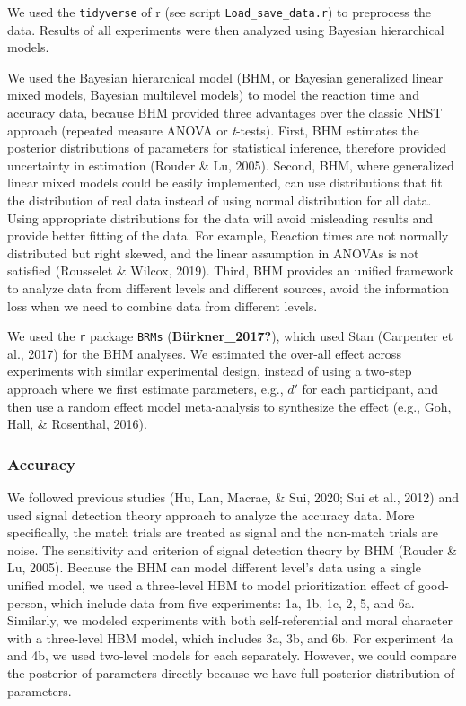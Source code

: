 \documentclass[
  man]{apa6}
\begin{document}
We used the \texttt{tidyverse} of r (see script \texttt{Load\_save\_data.r}) to preprocess the data. Results of all experiments were then analyzed using Bayesian hierarchical models.

We used the Bayesian hierarchical model (BHM, or Bayesian generalized linear mixed models, Bayesian multilevel models) to model the reaction time and accuracy data, because BHM provided three advantages over the classic NHST approach (repeated measure ANOVA or \emph{t}-tests). First, BHM estimates the posterior distributions of parameters for statistical inference, therefore provided uncertainty in estimation (Rouder \& Lu, 2005). Second, BHM, where generalized linear mixed models could be easily implemented, can use distributions that fit the distribution of real data instead of using normal distribution for all data. Using appropriate distributions for the data will avoid misleading results and provide better fitting of the data. For example, Reaction times are not normally distributed but right skewed, and the linear assumption in ANOVAs is not satisfied (Rousselet \& Wilcox, 2019). Third, BHM provides an unified framework to analyze data from different levels and different sources, avoid the information loss when we need to combine data from different levels.

We used the \texttt{r} package \texttt{BRMs} (\textbf{Bürkner\_2017?}), which used Stan (Carpenter et al., 2017) for the BHM analyses. We estimated the over-all effect across experiments with similar experimental design, instead of using a two-step approach where we first estimate parameters, e.g., \(d'\) for each participant, and then use a random effect model meta-analysis to synthesize the effect (e.g., Goh, Hall, \& Rosenthal, 2016).

\hypertarget{accuracy}{%
\subsubsection{Accuracy}\label{accuracy}}

We followed previous studies (Hu, Lan, Macrae, \& Sui, 2020; Sui et al., 2012) and used signal detection theory approach to analyze the accuracy data. More specifically, the match trials are treated as signal and the non-match trials are noise. The sensitivity and criterion of signal detection theory by BHM (Rouder \& Lu, 2005). Because the BHM can model different level's data using a single unified model, we used a three-level HBM to model prioritization effect of good-person, which include data from five experiments: 1a, 1b, 1c, 2, 5, and 6a. Similarly, we modeled experiments with both self-referential and moral character with a three-level HBM model, which includes 3a, 3b, and 6b. For experiment 4a and 4b, we used two-level models for each separately. However, we could compare the posterior of parameters directly because we have full posterior distribution of parameters.
\end{document}
